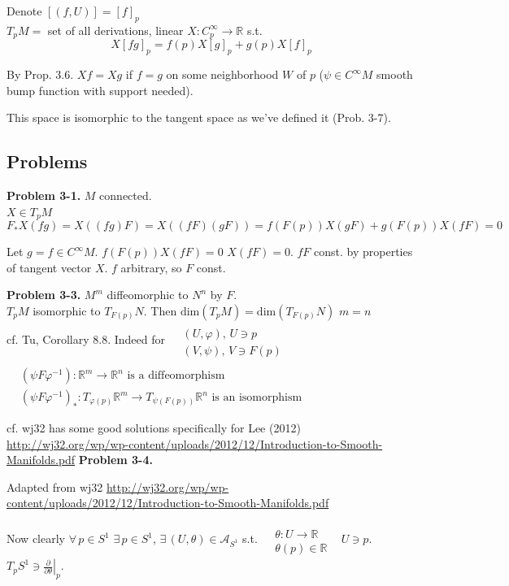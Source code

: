 \documentclass[11pt]{amsart}
\theoremstyle{definition}
\newcommand{\problemhead}[1]{\medskip\noindent\textbf{Problem #1.} }
\begin{document}
Denote $[ (f,U)] = [f]_p$ \\
$T_p M = $ set of all derivations, linear $X: C_p^{\infty} \to \mathbb{R}$ s.t.
\[
X[fg]_p = f(p) X[g]_p + g(p) X[f]_p
\]

By Prop. 3.6. $Xf = Xg$ if $f=g$ on some neighborhood $W$ of $p$ ($\psi \in C^{\infty}M$ smooth bump function with support needed).

This space is isomorphic to the tangent space as we've defined it (Prob. 3-7).




\subsection*{Problems}

\problemhead{3-1} $M$ connected.  \\
$X \in T_pM$
\[
F_*X(fg) = X((fg)F) = X((fF)(gF)) = f(F(p)) X(gF) + g(F(p))X(fF) = 0
\]

Let $g= f \in C^{\infty}M$.  $f(F(p))X(fF) = 0$ $X(fF) =0$.  $fF$ const. by properties of tangent vector $X$.  $f$ arbitrary, so $F$ const.

\problemhead{3-3} $M^m$ diffeomorphic to $N^n$ by $F$.  \\
$T_pM$ isomorphic to $T_{F(p)}N$.  Then $\text{dim}{ (T_pM)} = \text{dim}{ (T_{F(p)}N)}$  $m=n$  \\
cf. Tu, Corollary 8.8.  Indeed for $\begin{aligned} & \quad \\
  & (U,\varphi), \, U \ni p \\
  & (V, \psi ), \, V\ni F(p) \end{aligned}$ \quad \, $\begin{aligned} & \quad \\
  & (\psi F \varphi^{-1}):\mathbb{R}^m \to \mathbb{R}^n \text{ is a diffeomorphism } \\
  & (\psi F \varphi^{-1})_* : T_{ \varphi(p)} \mathbb{R}^m \to T_{\psi(F(p))} \mathbb{R}^n \text{ is an isomorphism } \end{aligned}$


cf. wj32 has some good solutions specifically for Lee (2012) \url{http://wj32.org/wp/wp-content/uploads/2012/12/Introduction-to-Smooth-Manifolds.pdf}
\problemhead{3-4}

Adapted from wj32 \url{http://wj32.org/wp/wp-content/uploads/2012/12/Introduction-to-Smooth-Manifolds.pdf}

Now clearly $\forall \, p \in S^1 $ $\exists \, p \in S^1$, $\exists \, (U,\theta) \in \mathcal{A}_{S^1}$ s.t. $\begin{aligned} & \quad \\
  & \theta : U \to \mathbb{R} \\
  & \theta(p) \in \mathbb{R}
\end{aligned}$ \quad \, $U \ni p$.  $T_p S^1 \ni \left. \frac{ \partial }{ \partial \theta} \right|_p$.
\end{document}
